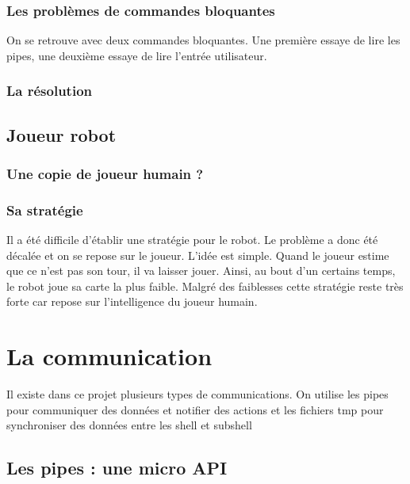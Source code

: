 \documentclass{article}
\begin{document}
\subsubsection{Les problèmes de commandes bloquantes}
On se retrouve avec deux commandes bloquantes. Une première essaye de lire les pipes, une deuxième essaye de lire l'entrée utilisateur. 
\subsubsection{La résolution}

\subsection{Joueur robot}
\subsubsection{Une copie de joueur humain ?}
\subsubsection{Sa stratégie}
Il a été difficile d'établir une stratégie pour le robot. Le problème a donc été décalée et on se repose sur le joueur. L'idée est simple. Quand le joueur estime que ce n'est pas son tour, il va laisser jouer. Ainsi, au bout d'un certains temps, le robot joue sa carte la plus faible. Malgré des faiblesses cette stratégie reste très forte car repose sur l'intelligence du joueur humain. 

\section{La communication}

Il existe dans ce projet plusieurs types de communications. On utilise les pipes pour communiquer des données et notifier des actions et les fichiers tmp pour synchroniser des données entre les shell et subshell

\subsection{Les pipes : une micro API}
\end{document}
